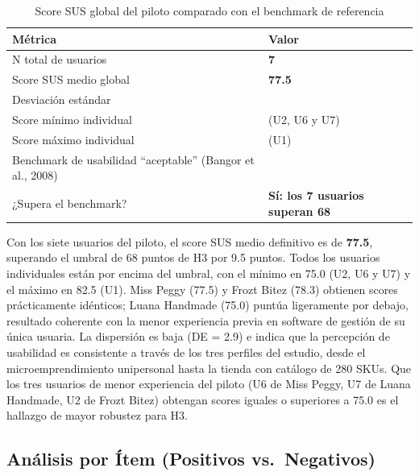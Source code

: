 \begin{longtable}[]{@{}
  >{\raggedright\arraybackslash}p{}
  >{\raggedright\arraybackslash}p{}@{}}
\caption[Score SUS global del piloto comparado con el benchmark de referencia]{Score SUS global del piloto comparado con el benchmark de referencia}\tabularnewline
\toprule\noalign{}
\begin{minipage}[b]{\linewidth}\raggedright
Métrica
\end{minipage} & \begin{minipage}[b]{\linewidth}\raggedright
Valor
\end{minipage} \\
\midrule\noalign{}
\endhead
\bottomrule\noalign{}
\endlastfoot
N total de usuarios & \textbf{7} \\
Score SUS medio global & \textbf{77.5} \\
Desviación estándar & 2.9 \\
Score mínimo individual & 75.0 (U2, U6 y U7) \\
Score máximo individual & 82.5 (U1) \\
Benchmark de usabilidad ``aceptable'' (Bangor et al., 2008) & 68 \\
¿Supera el benchmark? & \textbf{Sí: los 7 usuarios superan 68} \\
\end{longtable}

Con los siete usuarios del piloto, el score SUS medio definitivo es de \textbf{77.5}, superando el umbral de 68 puntos de H3 por 9.5 puntos. Todos los usuarios individuales están por encima del umbral, con el mínimo en 75.0 (U2, U6 y U7) y el máximo en 82.5 (U1). Miss Peggy (77.5) y Frozt Bitez (78.3) obtienen scores prácticamente idénticos; Luana Handmade (75.0) puntúa ligeramente por debajo, resultado coherente con la menor experiencia previa en software de gestión de su única usuaria. La dispersión es baja (DE = 2.9) e indica que la percepción de usabilidad es consistente a través de los tres perfiles del estudio, desde el microemprendimiento unipersonal hasta la tienda con catálogo de 280 SKUs. Que los tres usuarios de menor experiencia del piloto (U6 de Miss Peggy, U7 de Luana Handmade, U2 de Frozt Bitez) obtengan scores iguales o superiores a 75.0 es el hallazgo de mayor robustez para H3.

\subsection{Análisis por Ítem (Positivos vs.~Negativos)}\label{anuxe1lisis-por-uxedtem-positivos-vs.-negativos}


